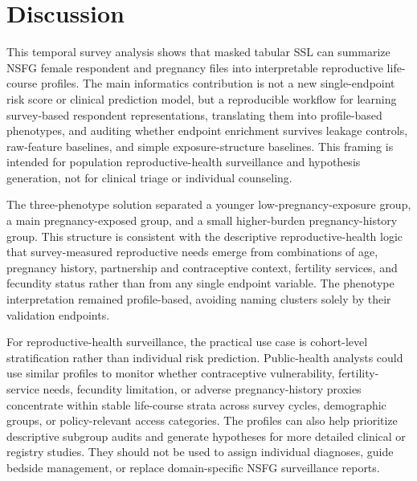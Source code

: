 \documentclass[referee,pdflatex,sn-basic,Numbered]{sn-jnl}
\begin{document}
\section{Discussion}

This temporal survey analysis shows that masked tabular SSL can summarize NSFG female respondent and pregnancy files into interpretable reproductive life-course profiles. The main informatics contribution is not a new single-endpoint risk score or clinical prediction model, but a reproducible workflow for learning survey-based respondent representations, translating them into profile-based phenotypes, and auditing whether endpoint enrichment survives leakage controls, raw-feature baselines, and simple exposure-structure baselines. This framing is intended for population reproductive-health surveillance and hypothesis generation, not for clinical triage or individual counseling.

The three-phenotype solution separated a younger low-pregnancy-exposure group, a main pregnancy-exposed group, and a small higher-burden pregnancy-history group. This structure is consistent with the descriptive reproductive-health logic that survey-measured reproductive needs emerge from combinations of age, pregnancy history, partnership and contraceptive context, fertility services, and fecundity status rather than from any single endpoint variable. The phenotype interpretation remained profile-based, avoiding naming clusters solely by their validation endpoints.

For reproductive-health surveillance, the practical use case is cohort-level stratification rather than individual risk prediction. Public-health analysts could use similar profiles to monitor whether contraceptive vulnerability, fertility-service needs, fecundity limitation, or adverse pregnancy-history proxies concentrate within stable life-course strata across survey cycles, demographic groups, or policy-relevant access categories. The profiles can also help prioritize descriptive subgroup audits and generate hypotheses for more detailed clinical or registry studies. They should not be used to assign individual diagnoses, guide bedside management, or replace domain-specific NSFG surveillance reports.
\end{document}
